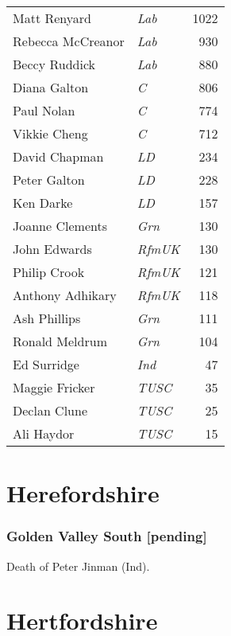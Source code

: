 \documentclass[a4paper,openany]{book}
\begin{document}
\begin{resultsiii}
\noindent
\begin{tabular*}{\columnwidth}{@{\extracolsep{\fill}} p{} >{\itshape}l r @{\extracolsep{\fill}}}
	Matt Renyard & Lab & 1022\\
	Rebecca McCreanor & Lab & 930\\
	Beccy Ruddick & Lab & 880\\
	Diana Galton & C & 806\\
	Paul Nolan & C & 774\\
	Vikkie Cheng & C & 712\\
	David Chapman & LD & 234\\
	Peter Galton & LD & 228\\
	Ken Darke & LD & 157\\
	Joanne Clements & Grn & 130\\
	John Edwards & RfmUK & 130\\
	Philip Crook & RfmUK & 121\\
	Anthony Adhikary & RfmUK & 118\\
	Ash Phillips & Grn & 111\\
	Ronald Meldrum & Grn & 104\\
	Ed Surridge & Ind & 47\\
	Maggie Fricker & TUSC & 35\\
	Declan Clune & TUSC & 25\\
	Ali Haydor & TUSC & 15\\
\end{tabular*}

\section{Herefordshire}

\subsubsection*{Golden Valley South \hspace*{\fill}\nolinebreak[1]%
	\enspace\hspace*{\fill}
	[pending]}


Death of Peter Jinman (Ind).

\section{Hertfordshire}


\end{resultsiii}
\end{document}
